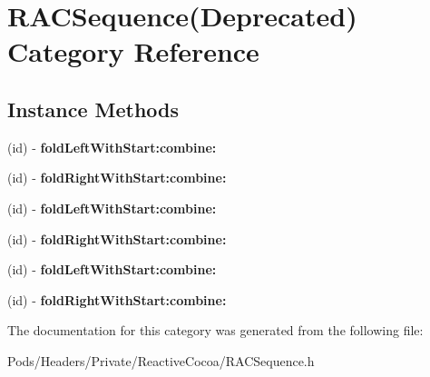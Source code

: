 \hypertarget{category_r_a_c_sequence_07_deprecated_08}{}\section{R\+A\+C\+Sequence(Deprecated) Category Reference}
\label{category_r_a_c_sequence_07_deprecated_08}
\subsection*{Instance Methods}
\begin{DoxyCompactItemize}
\item 
\mbox{\label{category_r_a_c_sequence_07_deprecated_08_a18bbf2a6860b117a3e8415cd570eb3a1}} 
(id) -\/ {\bfseries fold\+Left\+With\+Start\+:combine\+:}
\item 
\mbox{\label{category_r_a_c_sequence_07_deprecated_08_a29fa18ee693d511cfe4c6e5ae7664a6c}} 
(id) -\/ {\bfseries fold\+Right\+With\+Start\+:combine\+:}
\item 
\mbox{\label{category_r_a_c_sequence_07_deprecated_08_a18bbf2a6860b117a3e8415cd570eb3a1}} 
(id) -\/ {\bfseries fold\+Left\+With\+Start\+:combine\+:}
\item 
\mbox{\label{category_r_a_c_sequence_07_deprecated_08_a29fa18ee693d511cfe4c6e5ae7664a6c}} 
(id) -\/ {\bfseries fold\+Right\+With\+Start\+:combine\+:}
\item 
\mbox{\label{category_r_a_c_sequence_07_deprecated_08_a18bbf2a6860b117a3e8415cd570eb3a1}} 
(id) -\/ {\bfseries fold\+Left\+With\+Start\+:combine\+:}
\item 
\mbox{\label{category_r_a_c_sequence_07_deprecated_08_a29fa18ee693d511cfe4c6e5ae7664a6c}} 
(id) -\/ {\bfseries fold\+Right\+With\+Start\+:combine\+:}
\end{DoxyCompactItemize}


The documentation for this category was generated from the following file\+:\begin{DoxyCompactItemize}
\item 
Pods/\+Headers/\+Private/\+Reactive\+Cocoa/R\+A\+C\+Sequence.\+h\end{DoxyCompactItemize}
